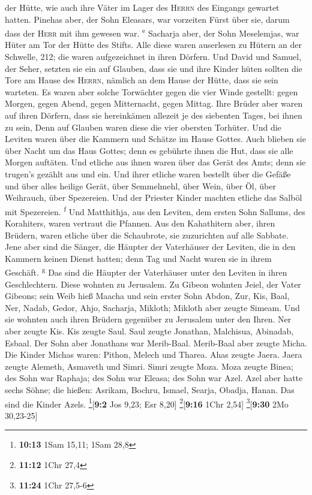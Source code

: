 der Hütte, wie auch ihre Väter im Lager des \textsc{Herrn} des Eingangs
gewartet hatten.  Pinehas aber, der Sohn Eleasars, war
vorzeiten Fürst über sie, darum dass der \textsc{Herr} mit ihm gewesen
war. \textsuperscript{e}  Sacharja aber, der Sohn
Meselemjas, war Hüter am Tor der Hütte des Stifts.  Alle
diese waren auserlesen zu Hütern an der Schwelle, 212; die waren
aufgezeichnet in ihren Dörfern. Und David und Samuel, der Seher, setzten
sie ein auf Glauben,  dass sie und ihre Kinder hüten
sollten die Tore am Hause des \textsc{Herrn}, nämlich an dem Hause der
Hütte, dass sie sein warteten.  Es waren aber solche
Torwächter gegen die vier Winde gestellt: gegen Morgen, gegen Abend,
gegen Mitternacht, gegen Mittag.  Ihre Brüder aber waren
auf ihren Dörfern, dass sie hereinkämen allezeit je des siebenten Tages,
bei ihnen zu sein,  Denn auf Glauben waren diese die vier
obersten Torhüter. Und die Leviten waren über die Kammern und Schätze im
Hause Gottes.  Auch blieben sie über Nacht um das Haus
Gottes; denn es gebührte ihnen die Hut, dass sie alle Morgen auftäten.
 Und etliche aus ihnen waren über das Gerät des Amts;
denn sie trugen's gezählt aus und ein.  Und ihrer etliche
waren bestellt über die Gefäße und über alles heilige Gerät, über
Semmelmehl, über Wein, über Öl, über Weihrauch, über Spezereien.
 Und der Priester Kinder machten etliche das Salböl mit
Spezereien. \textsuperscript{f}  Und Matthithja, aus den
Leviten, dem ersten Sohn Sallums, des Korahiters, waren vertraut die
Pfannen.  Aus den Kahathitern aber, ihren Brüdern, waren
etliche über die Schaubrote, sie zuzurichten auf alle Sabbate.
 Jene aber sind die Sänger, die Häupter der Vaterhäuser
der Leviten, die in den Kammern keinen Dienst hatten; denn Tag und Nacht
waren sie in ihrem Geschäft. \textsuperscript{g}  Das
sind die Häupter der Vaterhäuser unter den Leviten in ihren
Geschlechtern. Diese wohnten zu Jerusalem.  Zu Gibeon
wohnten Jeiel, der Vater Gibeons; sein Weib hieß Maacha 
und sein erster Sohn Abdon, Zur, Kis, Baal, Ner, Nadab, 
Gedor, Ahjo, Sacharja, Mikloth;  Mikloth aber zeugte
Simeam. Und sie wohnten auch ihren Brüdern gegenüber zu Jerusalem unter
den Ihren.  Ner aber zeugte Kis. Kis zeugte Saul. Saul
zeugte Jonathan, Malchisua, Abinadab, Esbaal.  Der Sohn
aber Jonathans war Merib-Baal. Merib-Baal aber zeugte Micha.
 Die Kinder Michas waren: Pithon, Melech und Tharea.
 Ahas zeugte Jaera. Jaera zeugte Alemeth, Asmaveth und
Simri. Simri zeugte Moza.  Moza zeugte Binea; des Sohn
war Raphaja; des Sohn war Eleasa; des Sohn war Azel. 
Azel aber hatte sechs Söhne; die hießen: Asrikam, Bochru, Ismael,
Searja, Obadja, Hanan. Das sind die Kinder Azels.
\footnote{\textbf{10:13} 1Sam 15,11; 1Sam 28,8}{[}\textbf{9:2} Jos 9,23;
Esr 8,20{]} \footnote{\textbf{11:12} 1Chr 27,4}{[}\textbf{9:16} 1Chr
2,54{]} \footnote{\textbf{11:24} 1Chr 27,5-6}{[}\textbf{9:30} 2Mo
30,23-25{]}

